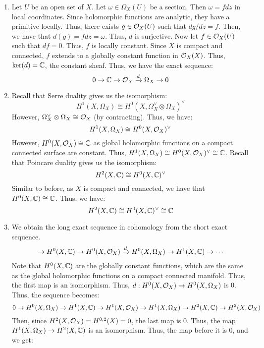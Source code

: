 \documentclass[12pt]{article}
\begin{document}
\begin{solution}
    \bbni 
    \begin{enumerate}
        \item Let $U$ be an open set of $X$. Let $\omega \in \Omega_X(U)$ be a section. Then $\omega = f dz$ in local coordinates. Since holomorphic functions are analytic, they have a primitive locally. Thus, there exists $g \in \mathcal{O}_X(U)$ such that $dg/dz = f$. Then, we have that $d(g) = f dz = \omega$. Thus, $d$ is surjective. \bbni
        Now let $f \in \mathcal{O}_X(U)$ such that $df = 0$. Thus, $f$ is locally constant. Since $X$ is compact and connected, $f$ extends to a globally constant function in $\mathcal{O}_X(X)$. Thus, $\ker(d) = \mathbb C$, the constant sheaf. \bbni
        Thus, we have the exact sequence:
        \[ 0 \to \mathbb C \to \mathcal{O}_X \xrightarrow{d} \Omega_X \to 0\]
        \item Recall that Serre duality gives us the isomorphism:
        \[ H^1(X, \Omega_X) \cong H^0(X, \Omega_X^\vee \otimes \Omega_X)^\vee\]
        However, $\Omega_X^\vee \otimes \Omega_X \cong \mathcal{O}_X$ (by contracting). Thus, we have:
        \[ H^1(X, \Omega_X) \cong H^0(X, \mathcal{O}_X)^\vee\]
        However, $H^0(X, \mathcal{O}_X) \cong \mathbb C$ as global holomorphic functions on a compact connected surface are constant. Thus, $H^1(X, \Omega_X) \cong H^0(X, \mathcal{O}_X)^\vee \cong \mathbb C$. \bbni
        Recall that Poincare duality gives us the isomorphism:
        \[ H^2(X, \mathbb C) \cong H^0(X, \mathbb C)^\vee\]
        Similar to before, as $X$ is compact and connected, we have that $H^0(X, \mathbb C) \cong \mathbb C$. Thus, we have:
        \[ H^2(X, \mathbb C) \cong H^0(X, \mathbb C)^\vee \cong \mathbb C\]
        \item We obtain the long exact sequence in cohomology from the short exact sequence. 
        \begin{align*}
            \to H^0(X, \mathbb C) \to H^0(X, \mathcal{O}_X) \xrightarrow{d} H^0(X, \Omega_X) \to H^1(X, \mathbb C) \to \cdots
        \end{align*}
        Note that $H^0(X, \mathbb C)$ are the globally constant functions, which are the same as the global holomorphic functions on a compact connected manifold. Thus, the first map is an isomorphism. Thus, $d:H^0(X, \mathcal{O}_X) \to H^0(X, \Omega_X)$ is $0$. Thus, the sequence becomes:
        \[0 \to H^0(X, \Omega_X) \to H^1(X, \mathbb C) \to H^1(X,\mathcal{O}_X) \to H^1(X, \Omega_X) \to H^2(X, \mathbb C) \to  H^2(X, \mathcal{O}_X) \]
        Then, since $H^2(X, \mathcal{O}_X) = H^{0,2}(X) = 0$, the last map is $0$. Thus, the map $H^1(X, \Omega_X) \to H^2(X, \mathbb C)$ is an isomorphism. Thus, the map before it is $0$, and we get:

\end{enumerate}
\end{solution}
\end{document}
